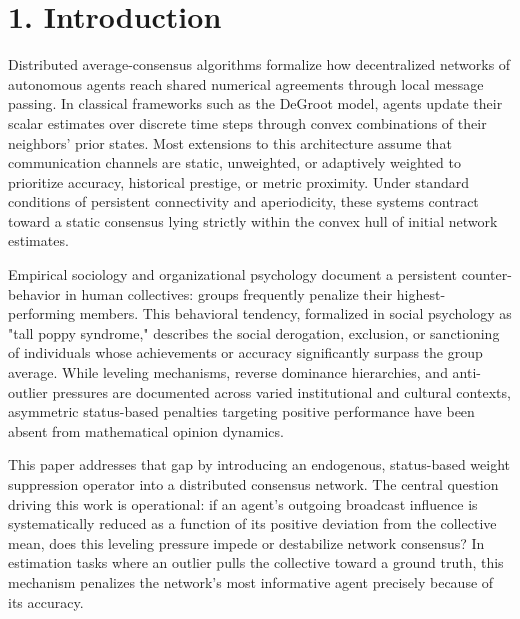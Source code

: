 \section{1. Introduction}
Distributed average-consensus algorithms formalize how decentralized networks of autonomous agents reach shared numerical agreements through local message passing\cite{degroot1974reaching}. In classical frameworks such as the DeGroot model, agents update their scalar estimates over discrete time steps through convex combinations of their neighbors' prior states\cite{degroot1974reaching}. Most extensions to this architecture assume that communication channels are static, unweighted, or adaptively weighted to prioritize accuracy, historical prestige, or metric proximity\cite{degroot1974reaching}. Under standard conditions of persistent connectivity and aperiodicity, these systems contract toward a static consensus lying strictly within the convex hull of initial network estimates\cite{degroot1974reaching}.

Empirical sociology and organizational psychology document a persistent counter-behavior in human collectives: groups frequently penalize their highest-performing members\cite{degroot1974reaching}. This behavioral tendency, formalized in social psychology as "tall poppy syndrome," describes the social derogation, exclusion, or sanctioning of individuals whose achievements or accuracy significantly surpass the group average\cite{degroot1974reaching}. While leveling mechanisms, reverse dominance hierarchies, and anti-outlier pressures are documented across varied institutional and cultural contexts, asymmetric status-based penalties targeting positive performance have been absent from mathematical opinion dynamics\cite{degroot1974reaching}.

This paper addresses that gap by introducing an endogenous, status-based weight suppression operator into a distributed consensus network\cite{degroot1974reaching}. The central question driving this work is operational: if an agent's outgoing broadcast influence is systematically reduced as a function of its positive deviation from the collective mean, does this leveling pressure impede or destabilize network consensus\cite{degroot1974reaching}? In estimation tasks where an outlier pulls the collective toward a ground truth, this mechanism penalizes the network's most informative agent precisely because of its accuracy\cite{degroot1974reaching}.

